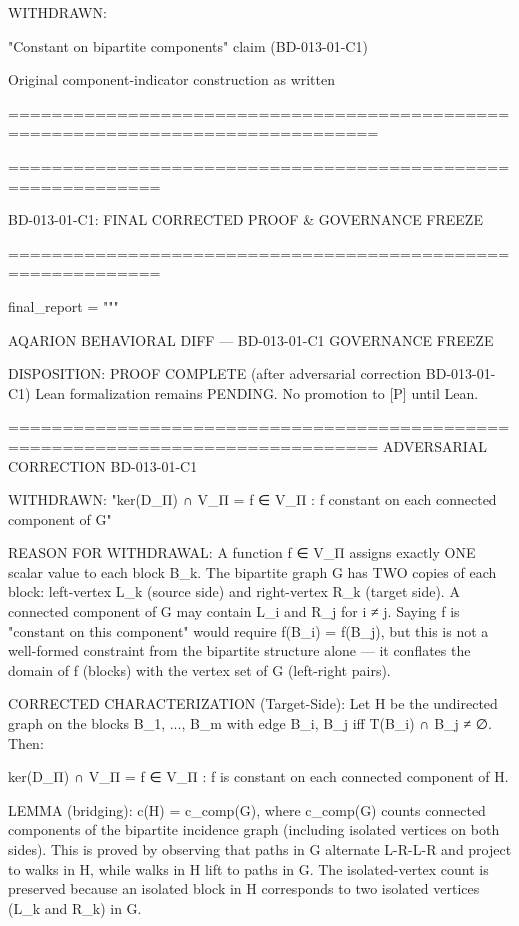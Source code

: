 WITHDRAWN:

"Constant on bipartite components" claim (BD-013-01-C1)

Original component-indicator construction as written


================================================================================

============================================================

BD-013-01-C1: FINAL CORRECTED PROOF & GOVERNANCE FREEZE

============================================================

final_report = """

AQARION BEHAVIORAL DIFF — BD-013-01-C1 GOVERNANCE FREEZE

DISPOSITION: PROOF COMPLETE (after adversarial correction BD-013-01-C1)
Lean formalization remains PENDING. No promotion to [P] until Lean.

================================================================================
ADVERSARIAL CORRECTION BD-013-01-C1

WITHDRAWN:
"ker(D_Π) ∩ V_Π = {f ∈ V_Π : f constant on each connected component of G}"

REASON FOR WITHDRAWAL:
A function f ∈ V_Π assigns exactly ONE scalar value to each block B_k.
The bipartite graph G has TWO copies of each block: left-vertex L_k
(source side) and right-vertex R_k (target side). A connected component
of G may contain L_i and R_j for i ≠ j. Saying f is "constant on this
component" would require f(B_i) = f(B_j), but this is not a well-formed
constraint from the bipartite structure alone — it conflates the domain
of f (blocks) with the vertex set of G (left-right pairs).

CORRECTED CHARACTERIZATION (Target-Side):
Let H be the undirected graph on the blocks {B_1, ..., B_m} with edge
{B_i, B_j} iff T(B_i) ∩ B_j ≠ ∅. Then:

ker(D_Π) ∩ V_Π = {f ∈ V_Π : f is constant on each connected component of H}.

LEMMA (bridging): c(H) = c_comp(G), where c_comp(G) counts connected
components of the bipartite incidence graph (including isolated vertices
on both sides). This is proved by observing that paths in G alternate
L-R-L-R and project to walks in H, while walks in H lift to paths in G.
The isolated-vertex count is preserved because an isolated block in H
corresponds to two isolated vertices (L_k and R_k) in G.

